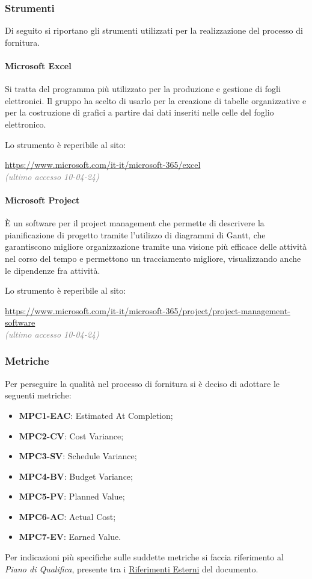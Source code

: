 \subsubsection{Strumenti}
Di seguito si riportano gli strumenti utilizzati per la realizzazione del processo di fornitura.
\paragraph{Microsoft Excel}
Si tratta del programma più utilizzato per la produzione e gestione di fogli elettronici. Il gruppo ha scelto di usarlo per la creazione di tabelle organizzative e per la costruzione di grafici a partire dai dati inseriti nelle celle del foglio elettronico.
\par Lo strumento è reperibile al sito:
\begin{center}
    \url{https://www.microsoft.com/it-it/microsoft-365/excel}\\ \textcolor{gray}{\textit{(ultimo accesso 10-04-24)}}
\end{center}

\paragraph{Microsoft Project}
È un software per il project management che permette di descrivere la pianificazione di progetto tramite l'utilizzo di diagrammi di Gantt, che garantiscono migliore organizzazione tramite una visione più efficace delle attività nel corso del tempo e permettono un tracciamento migliore, visualizzando anche le dipendenze fra attività.
\par Lo strumento è reperibile al sito:
\begin{center}
    \url{https://www.microsoft.com/it-it/microsoft-365/project/project-management-software}\\ \textcolor{gray}{\textit{(ultimo accesso 10-04-24)}}
\end{center}

\subsubsection{Metriche}\label{sec:processi_primari:fornitura:metriche}
Per perseguire la qualità nel processo di fornitura si è deciso di adottare le seguenti metriche:
\begin{itemize}
    \item \textbf{MPC1-EAC}: Estimated At Completion;
    \item \textbf{MPC2-CV}: Cost Variance;
    \item \textbf{MPC3-SV}: Schedule Variance;
    \item \textbf{MPC4-BV}: Budget Variance;
    \item \textbf{MPC5-PV}: Planned Value;
    \item \textbf{MPC6-AC}: Actual Cost;
    \item \textbf{MPC7-EV}: Earned Value.
\end{itemize}
Per indicazioni più specifiche sulle suddette metriche si faccia riferimento al \textit{Piano di Qualifica}, presente tra i \hyperref[sec:riferimenti_esterni]{Riferimenti Esterni} del documento.

